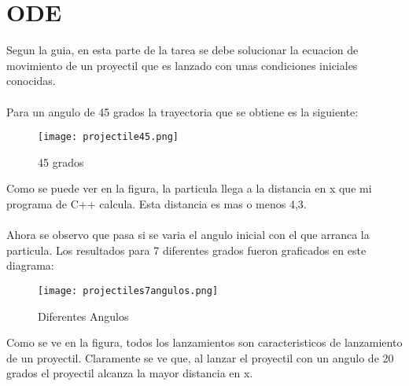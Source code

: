 \documentclass{article}[11]
\title{Tarea #4 Metodos Computacionales}
\author{Felipe Bonilla W\\Universidad de Los Andes}
\date{19 de Noviembre del 2018}
\begin{document}
\maketitle
\begin{abstract}
Mediante los programas de Python, C++ y Make se espera resolver una ecuacion diferencial ordinaria y una ecuacion diferencial parcial. La idea es que estas dos ecuaciones sean resueltas y arrojen datos que permitan obtener una serie de diagramas que seran analizados para emtender lo sucedido. Ademas, por medio de un archivo de Make, se espera poder combinar todos los archivos y lograr que este informe sea completado por las graficas, que varian segun los datos.
\end{abstract}

    
\section{ODE}
Segun la guia, en esta parte de la tarea se debe solucionar la ecuacion de movimiento de un proyectil que es lanzado con unas condiciones iniciales conocidas.
\\
\\
Para un angulo de 45 grados la trayectoria que se obtiene es la siguiente:


\begin{figure}[H]
    \centering
    \texttt{[image: projectile45.png]}
    \caption{45 grados}
    \label{fig:my_label}
\end{figure}


Como se puede ver en la figura, la particula llega a la distancia en x que mi programa de C++ calcula. Esta distancia es mas o menos 4,3.
\\
\\
Ahora se observo que pasa si se varia el angulo inicial con el que arranca la particula. Los resultados para 7 diferentes grados fueron graficados en este diagrama:

\begin{figure}[H]
    \centering
    \texttt{[image: projectiles7angulos.png]}
    \caption{Diferentes Angulos}
    \label{fig:my_label}
\end{figure}

Como se ve en la figura, todos los lanzamientos son caracteristicos de lanzamiento de un proyectil. Claramente se ve que, al lanzar el proyectil con un angulo de 20 grados el proyectil alcanza la mayor distancia en x.
\end{document}
